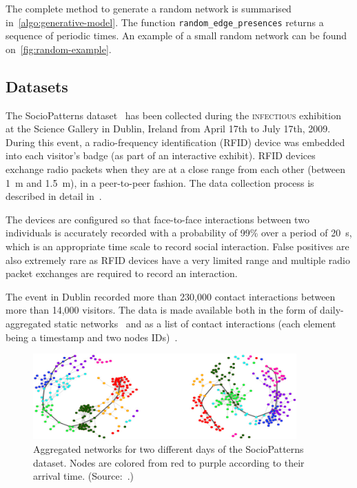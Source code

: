 \documentclass[a4paper,11pt,openany,extrafontsizes]{memoir}
\begin{document}
The complete method to generate a random network is summarised
in~\autoref{algo:generative-model}. The function
\texttt{random\_edge\_presences} returns a sequence of periodic
times. An example of a small random network can be found
on~\autoref{fig:random-example}.

\subsection{Datasets}%
\label{sec:datasets}

The SocioPatterns dataset~\cite{isella_whats_2011} has been collected
during the \textsc{infectious} exhibition at the Science Gallery in
Dublin, Ireland from April 17th to July 17th, 2009. During this event,
a radio-frequency identification (RFID) device was embedded into each
visitor's badge (as part of an interactive exhibit). RFID devices
exchange radio packets when they are at a close range from each other
(between 1~m and 1.5~m), in a peer-to-peer fashion. The data
collection process is described in detail
in~\cite{cattuto_dynamics_2010}.

The devices are configured so that face-to-face interactions between
two individuals is accurately recorded with a probability of 99\% over
a period of 20~s, which is an appropriate time scale to record social
interaction. False positives are also extremely rare as RFID devices
have a very limited range and multiple radio packet exchanges are
required to record an interaction.

The event in Dublin recorded more than 230,000 contact interactions
between more than 14,000 visitors. The data is made available both in
the form of daily-aggregated static
networks~\cite{noauthor_infectious_2011} and as a list of contact
interactions (each element being a timestamp and two nodes
IDs)~\cite{noauthor_infectious_2011-1}.

\begin{figure}[ht]
  \centering
  \includegraphics[width=0.9\textwidth]{fig/sociopatterns.jpg}
  \caption[Aggregated networks for two different days of the
  SocioPatterns dataset.]{Aggregated networks for two different days
    of the SocioPatterns dataset. Nodes are colored from red to purple
    according to their arrival
    time. (Source:~\cite{isella_whats_2011}.)}%
  \label{fig:sp_plot}
\end{figure}
\end{document}
